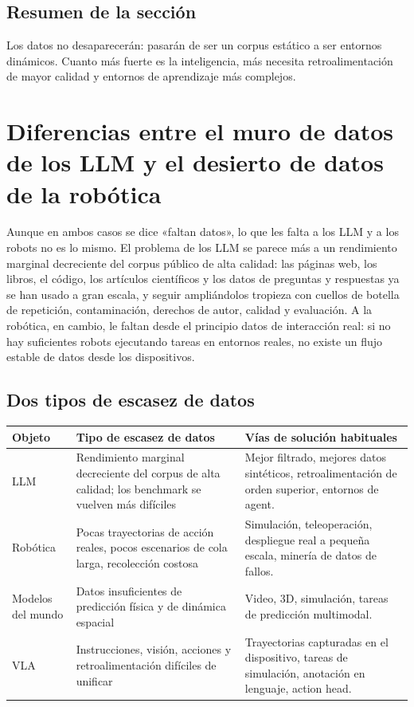 \documentclass[a4paper]{article}
\begin{document}
\subsection{Resumen de la sección}

Los datos no desaparecerán: pasarán de ser un corpus estático a ser entornos dinámicos. Cuanto más fuerte es la inteligencia, más necesita retroalimentación de mayor calidad y entornos de aprendizaje más complejos.
\section{Diferencias entre el muro de datos de los LLM y el desierto de datos de la robótica}

Aunque en ambos casos se dice «faltan datos», lo que les falta a los LLM y a los robots no es lo mismo. El problema de los LLM se parece más a un rendimiento marginal decreciente del corpus público de alta calidad: las páginas web, los libros, el código, los artículos científicos y los datos de preguntas y respuestas ya se han usado a gran escala, y seguir ampliándolos tropieza con cuellos de botella de repetición, contaminación, derechos de autor, calidad y evaluación. A la robótica, en cambio, le faltan desde el principio datos de interacción real: si no hay suficientes robots ejecutando tareas en entornos reales, no existe un flujo estable de datos desde los dispositivos.

\subsection{Dos tipos de escasez de datos}

\noindent\begin{longtable}{p{}p{}p{}}
\toprule
Objeto & Tipo de escasez de datos & Vías de solución habituales \\
\midrule
LLM & Rendimiento marginal decreciente del corpus de alta calidad; los benchmark se vuelven más difíciles & Mejor filtrado, mejores datos sintéticos, retroalimentación de orden superior, entornos de agent. \\
Robótica & Pocas trayectorias de acción reales, pocos escenarios de cola larga, recolección costosa & Simulación, teleoperación, despliegue real a pequeña escala, minería de datos de fallos. \\
Modelos del mundo & Datos insuficientes de predicción física y de dinámica espacial & Video, 3D, simulación, tareas de predicción multimodal. \\
VLA & Instrucciones, visión, acciones y retroalimentación difíciles de unificar & Trayectorias capturadas en el dispositivo, tareas de simulación, anotación en lenguaje, action head. \\
\bottomrule
\end{longtable}
\end{document}
